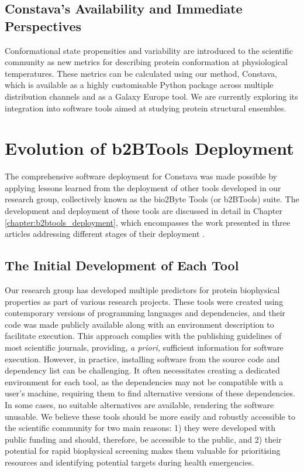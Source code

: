 \subsection{Constava's Availability and Immediate Perspectives}

Conformational state propensities and variability are introduced to the scientific community as new metrics for describing protein conformation at physiological temperatures. These metrics can be calculated using our method, Constava, which is available as a highly customisable Python package across multiple distribution channels and as a Galaxy Europe tool. We are currently exploring its integration into software tools aimed at studying protein structural ensembles.


\section{Evolution of b2BTools Deployment}

The comprehensive software deployment for Constava was made possible by applying lessons learned from the deployment of other tools developed in our research group, collectively known as the bio2Byte Tools (or b2BTools) suite. The development and deployment of these tools are discussed in detail in Chapter \ref{chapter:b2btools_deployment}, which encompasses the work presented in three articles addressing different stages of their deployment \cite{kagami_online_2021, kagami_b2btools_2021, gavalda-garcia_bio2byte_2024}. 


\subsection{The Initial Development of Each Tool}

Our research group has developed multiple predictors for protein biophysical properties as part of various research projects. These tools were created using contemporary versions of programming languages and dependencies, and their code was made publicly available along with an environment description to facilitate execution. This approach complies with the publishing guidelines of most scientific journals, providing, \textit{a priori}, sufficient information for software execution. However, in practice, installing software from the source code and dependency list can be challenging. It often necessitates creating a dedicated environment for each tool, as the dependencies may not be compatible with a user’s machine, requiring them to find alternative versions of these dependencies. In some cases, no suitable alternatives are available, rendering the software unusable. We believe these tools should be more easily and robustly accessible to the scientific community for two main reasons: 1) they were developed with public funding and should, therefore, be accessible to the public, and 2) their potential for rapid biophysical screening makes them valuable for prioritising resources and identifying potential targets during health emergencies.

